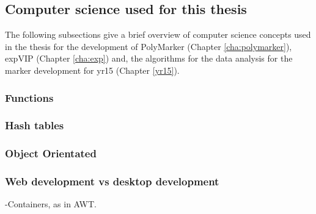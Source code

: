 

\subsection{Computer science used for this thesis}

The following subsections give a brief overview of computer science concepts used in the thesis for the development of PolyMarker (Chapter \ref{cha:polymarker}), expVIP (Chapter \ref{cha:exp}) and, the algorithms for the data analysis for the marker development for \acrshort{yr15} (Chapter \ref{yr15}).  

\subsubsection{Functions}

\subsubsection{Hash tables}

\subsubsection{Object Orientated}

\subsubsection{Web development vs desktop development}










-Containers, as in AWT. 

 \label{lit:patterns}